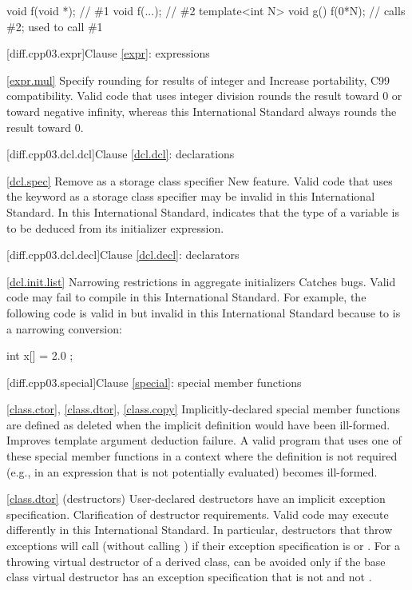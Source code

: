 \begin{codeblock}
void f(void *);  // \#1
void f(...);     // \#2
template<int N> void g() {
  f(0*N);        // calls \#2; used to call \#1
}
\end{codeblock}

[diff.cpp03.expr]{Clause \ref{expr}: expressions}

\ref{expr.mul}
\change Specify rounding for results of integer \tcode{/} and \tcode{\%}
\rationale Increase portability, C99 compatibility.
\effect
Valid \CppIII code that uses integer division rounds the result toward 0 or
toward negative infinity, whereas this International Standard always rounds
the result toward 0.

[diff.cpp03.dcl.dcl]{Clause \ref{dcl.dcl}: declarations}

\ref{dcl.spec}
\change Remove  as a storage class specifier
\rationale New feature.
\effect
Valid \CppIII code that uses the keyword  as a storage class
specifier may be invalid in this International Standard. In this International
Standard,  indicates that the type of a variable is to be deduced
from its initializer expression.

[diff.cpp03.dcl.decl]{Clause \ref{dcl.decl}: declarators}

\ref{dcl.init.list}
\change Narrowing restrictions in aggregate initializers
\rationale Catches bugs.
\effect
Valid \CppIII code may fail to compile in this International Standard. For
example, the following code is valid in \CppIII but invalid in this
International Standard because  to  is a narrowing
conversion:

\begin{codeblock}
int x[] = { 2.0 };
\end{codeblock}

[diff.cpp03.special]{Clause \ref{special}: special member functions}

\ref{class.ctor}, \ref{class.dtor}, \ref{class.copy}
\change Implicitly-declared special member functions are defined as deleted
when the implicit definition would have been ill-formed.
\rationale Improves template argument deduction failure.
\effect
A valid \CppIII program that uses one of these special member functions in a
context where the definition is not required (e.g., in an expression that is
not potentially evaluated) becomes ill-formed.

\ref{class.dtor} (destructors)
\change User-declared destructors have an implicit exception specification.
\rationale Clarification of destructor requirements.
\effect
Valid \CppIII code may execute differently in this International Standard. In
particular, destructors that throw exceptions will call 
(without calling ) if their exception specification is
 or . For a throwing virtual destructor
of a derived class,  can be avoided only if the base class
virtual destructor has an exception specification that is not 
and not .

